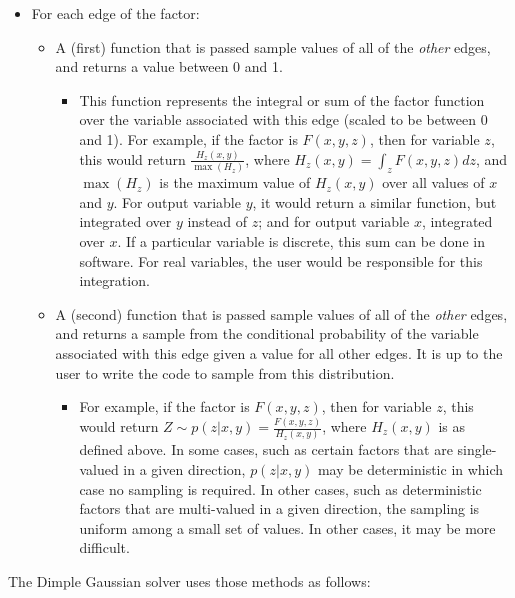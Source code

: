 \begin{itemize}
\item For each edge of the factor:
\begin{itemize}
\item A (first) function that is passed sample values of all of the \emph{other} edges, and returns a value between 0 and 1.
\begin{itemize}
\item This function represents the integral or sum of the factor function over the variable associated with this edge (scaled to be between 0 and 1). For example, if the factor is $F(x,y,z)$, then for variable $z$, this would return $\frac{H_{z}(x,y)}{\max(H_{z})}$, where $H_{z}(x,y) = \int_z F(x,y,z) dz$, and $\max(H_{z})$ is the maximum value of $H_{z}(x,y)$ over all values of $x$ and $y$. For output variable $y$, it would return a similar function, but integrated over $y$ instead of $z$; and for output variable $x$, integrated over $x$. If a particular variable is discrete, this sum can be done in software. For real variables, the user would be responsible for this integration.
\end{itemize}
\item A (second) function that is passed sample values of all of the \emph{other} edges, and returns a sample from the conditional probability of the variable associated with this edge given a value for all other edges. It is up to the user to write the code to sample from this distribution.
\begin{itemize}
\item For example, if the factor is $F(x,y,z)$, then for variable $z$, this would return $Z \sim p(z|x,y) = \frac{F(x,y,z) }{ H_{z}(x,y)}$, where $H_{z}(x,y)$ is as defined above. In some cases, such as certain factors that are single-valued in a given direction, $p(z|x,y)$ may be deterministic in which case no sampling is required. In other cases, such as deterministic factors that are multi-valued in a given direction, the sampling is uniform among a small set of values. In other cases, it may be more difficult.
\end{itemize}
\end{itemize}
\end{itemize}


The Dimple Gaussian solver uses those methods as follows:

